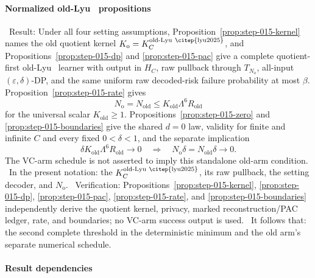 \paragraph{Normalized old-Lyu~\citep{lyu2025} propositions}

\noindent\textbullet\ Result: Under all four setting assumptions, Proposition~\ref{prop:step-015-kernel} names the old quotient kernel
  \(K_{\mathrm o}=K_C^{\mathrm{old\text{-}Lyu~\citep{lyu2025}}}\), and 
  Propositions~\ref{prop:step-015-dp} and
  \ref{prop:step-015-pac} give a complete quotient-first old-Lyu~\citep{lyu2025} learner with
  output in \(H_C\), raw pullback through \(T_{N_{\mathrm o}}\), all-input
  \((\varepsilon,\delta)\)-DP, and the same uniform raw decoded-risk failure
  probability at most \(\beta\). Proposition~\ref{prop:step-015-rate} gives
  \[
  N_{\mathrm o}=N_{\mathrm{old}}
  \le K_{\mathrm{old}}\Lambda^6R_{\mathrm{old}}
  \tag{C.O}
  \]
  for the universal scalar \(K_{\mathrm{old}}\ge1\). 
  Propositions~\ref{prop:step-015-zero} and
  \ref{prop:step-015-boundaries} give the shared \(d=0\) law, validity for
  finite and infinite \(C\) and every fixed \(0<\delta<1\), and the separate
  implication
  \[
  \delta K_{\mathrm{old}}\Lambda^6R_{\mathrm{old}}\to0
  \quad\Longrightarrow\quad
  N_{\mathrm o}\delta=N_{\mathrm{old}}\delta\to0.
  \tag{C.O\delta}
  \]
  The VC-arm schedule is not asserted to imply this standalone old-arm
  condition.
\noindent\textbullet\ In the present notation: the 
  \(K_C^{\mathrm{old\text{-}Lyu~\citep{lyu2025}}}\), its raw pullback, the setting decoder,
  and \(N_{\mathrm o}\).
\noindent\textbullet\ Verification: 
  Propositions~\ref{prop:step-015-kernel}, \ref{prop:step-015-dp},
  \ref{prop:step-015-pac}, \ref{prop:step-015-rate}, and
  \ref{prop:step-015-boundaries} independently derive the quotient kernel,
  privacy, marked reconstruction/PAC ledger, rate, and boundaries; no VC-arm
  success output is used.
\noindent\textbullet\ It follows that: the second complete threshold in the deterministic minimum
  and the old arm's separate numerical schedule.

\paragraph{Result dependencies}

